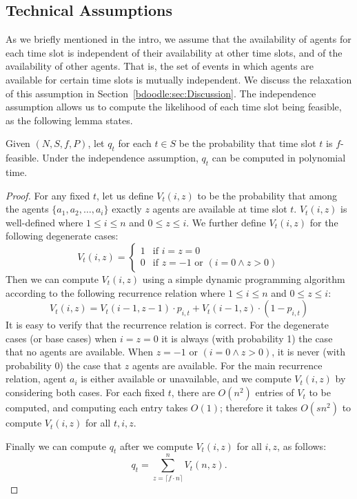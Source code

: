 \subsection{Technical Assumptions}
As we briefly mentioned in the intro, we assume that the availability of agents for each time slot is independent of their availability at other time slots, and of the availability of other agents. That is, the set of events in which agents are available for certain time slots is mutually independent. 
We discuss the relaxation of this assumption in Section~\ref{bdoodle:sec:Discussion}. The independence assumption allows us to compute the likelihood of each time slot being feasible, as the following lemma states. 
\begin{lemma} \label{bdoodle:lemma:q_t_polytime}
Given $(N, S, f, P)$, let $q_t$ for each $t\in S$ be the probability that time slot $t$ is $f$-feasible. Under the independence assumption, $q_t$ can be computed in polynomial time.
\end{lemma}
\begin{proof}
For any fixed $t$, let us define $V_t(i, z)$ to be the probability that among the agents $\{a_1, a_2, \dots, a_i\}$ exactly $z$ agents are available at time slot $t$. $V_t(i, z)$ is well-defined where $1 \leq i \leq n$ and $0 \leq z \leq i$. We further define $V_t(i, z)$ for the following degenerate cases:
\begin{equation*}
V_t(i, z) =
\begin{cases} 
	1 & \mbox{if~} i = z = 0 \\
	0 & \mbox{if~} z = -1 \mbox{~or~} (i = 0 \land z > 0)
\end{cases}
\end{equation*}
Then we can compute $V_t(i, z)$ using a simple dynamic programming algorithm according to the following recurrence relation where $1 \leq i \leq n$ and $0 \leq z \leq i$:
\begin{equation} \label{bdoodle:eqn:vt_precompute}
V_t(i, z) = V_t(i-1, z-1) \cdot p_{i,t} + V_t(i-1, z) \cdot (1- p_{i,t}) 
\end{equation}
It is easy to verify that the recurrence relation is correct. For the degenerate cases (or base cases) when $i = z = 0$ it is always (with probability 1) the case that no agents are available. When $z = -1$ or $(i=0 \land z>0)$, it is never (with probability 0) the case that $z$ agents are available. For the main recurrence relation, agent $a_i$ is either available or unavailable, and we compute $V_t(i, z)$ by considering both cases. For each fixed $t$, there are $O(n^2)$ entries of $V_t$ to be computed, and computing each entry takes $O(1)$; therefore it takes $O(sn^2)$ to compute $V_t(i, z)$ for all $t, i, z$. 

Finally we can compute $q_t$ after we compute $V_t(i, z)$ for all $i,z$, as follows:
\begin{equation}
q_t = \sum_{z = \lceil f \cdot n \rceil}^{n} V_t(n, z).
 \end{equation}
\end{proof}

